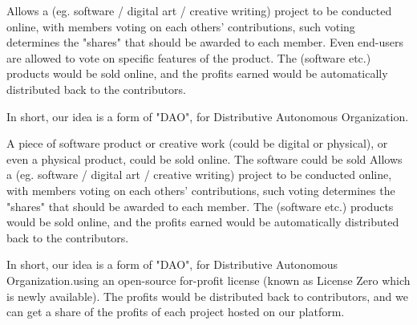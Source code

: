 Allows a (eg. software / digital art / creative writing) project to be conducted online, with members voting on each others' contributions, such voting determines the "shares" that should be awarded to each member.  Even end-users are allowed to vote on specific features of the product.  The (software etc.) products would be sold online, and the profits earned would be automatically distributed back to the contributors.

In short, our idea is a form of "DAO", for Distributive Autonomous Organization.

A piece of software product or creative work (could be digital or physical), or even a physical product, could be sold online.  The software could be sold Allows a (eg. software / digital art / creative writing) project to be conducted online, with members voting on each others' contributions, such voting determines the "shares" that should be awarded to each member.  The (software etc.) products would be sold online, and the profits earned would be automatically distributed back to the contributors.

In short, our idea is a form of "DAO", for Distributive Autonomous Organization.using an open-source for-profit license (known as License Zero which is newly available).  The profits would be distributed back to contributors, and we can get a share of the profits of each project hosted on our platform.
